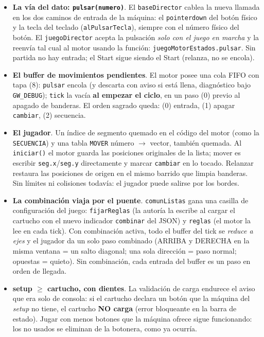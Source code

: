 \begin{itemize}
	\item \textbf{La vía del dato: \texttt{pulsar(numero)}}. El \texttt{baseDirector}
	cablea la nueva llamada en los dos caminos de entrada de la máquina: el
	\texttt{pointerdown} del botón físico y la tecla del teclado
	(\texttt{alPulsarTecla}), siempre con el número físico del botón. El
	\texttt{juegoDirector} acepta la pulsación \emph{solo con el juego en marcha} y la
	reenvía tal cual al motor usando la función: \texttt{juegoMotorEstados.pulsar}. Sin partida no hay
	entrada; el Start sigue siendo el Start (relanza, no se encola).

	\item \textbf{El buffer de movimientos pendientes}. El motor posee una cola FIFO con
	tapa (8): \texttt{pulsar} encola (y descarta con aviso si está llena, diagnóstico bajo
	\texttt{GW\_DEBUG}); \texttt{tick} la vacía \textbf{al empezar el ciclo}, en un paso
	(0) previo al apagado de banderas. El orden sagrado queda: (0) entrada, (1) apagar
	\texttt{cambiar}, (2) secuencia.

	\item \textbf{El jugador}. Un índice de segmento quemado en el código del motor (como
	la \texttt{SECUENCIA}) y una tabla \texttt{MOVER} número $\rightarrow$ vector, también
	quemada. Al \texttt{iniciar()} el motor guarda las posiciones originales de la lista;
	mover es escribir \texttt{seg.x}/\texttt{seg.y} directamente y marcar
	\texttt{cambiar} en lo tocado. Relanzar restaura las posiciones de origen en el mismo
	barrido que limpia banderas. Sin límites ni colisiones todavía: el jugador puede
	salirse por los bordes.

	\item \textbf{La combinación viaja por el puente}. \texttt{comunListas} gana una
	casilla de configuración del juego: \texttt{fijarReglas} (la autoría la escribe al
	cargar el cartucho con el nuevo indicador \texttt{combinar} del JSON) y
	\texttt{reglas} (el motor la lee en cada tick). Con combinación activa, todo el buffer
	del tick se \emph{reduce a ejes} y el jugador da un solo paso combinado (ARRIBA y
	DERECHA en la misma ventana = un salto diagonal; una sola dirección = paso normal;
	opuestas = quieto). Sin combinación, cada entrada del buffer es un paso en orden de
	llegada.

	\item \textbf{setup $\geq$ cartucho, con dientes}. La validación de carga endurece el
	aviso que era solo de consola: si el cartucho declara un botón que la máquina del
	\textit{setup} no tiene, el cartucho \textbf{NO carga} (error bloqueante en la barra
	de estado). Jugar con menos botones que la máquina ofrece sigue funcionando: los no
	usados se eliminan de la botonera, como ya ocurría.
\end{itemize}

